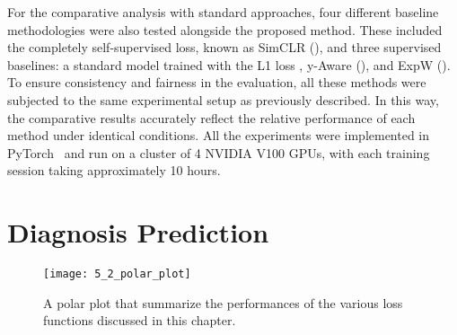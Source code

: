 For the comparative analysis with standard approaches, four different baseline
methodologies were also tested alongside the proposed method. These included the
completely self-supervised loss, known as SimCLR 
(), and three supervised baselines: a standard model trained
with the L1 loss , y-Aware
(), and ExpW (). To ensure consistency and
fairness in the evaluation, all these methods were subjected to the same
experimental setup as previously described. In this way, the comparative results
accurately reflect the relative performance of each method under identical
conditions.
All the experiments were implemented in PyTorch~\cite{paszke_2017} and run on a
cluster of 4 NVIDIA V100 GPUs, with
each training session taking approximately 10 hours. 

\section{Diagnosis Prediction}
\begin{figure}
    \texttt{[image: 5\_2\_polar\_plot]}
    \caption[Polar Plot of Various Tested Losses]{A polar plot that summarize
    the performances of the various loss functions discussed in this chapter.}
\end{figure}

